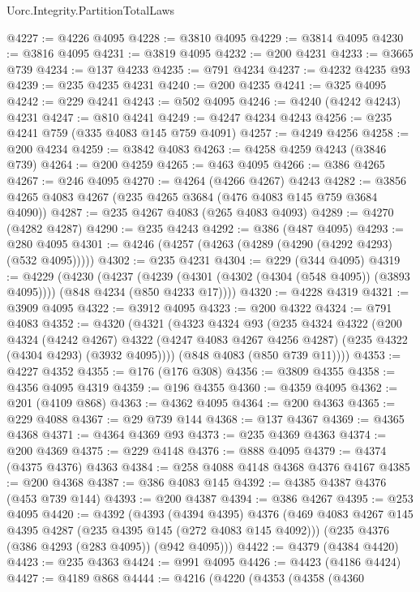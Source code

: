 \begin{lexlean}{Uorc.Integrity.PartitionTotalLaws}
\begin{coremodule}
@4227 := @4226 @4095
@4228 := @3810 @4095
@4229 := @3814 @4095
@4230 := @3816 @4095
@4231 := @3819 @4095
@4232 := @200 @4231
@4233 := @3665 @739
@4234 := @137 @4233
@4235 := @791 @4234
@4237 := @4232 @4235 @93
@4239 := @235 @4235 @4231
@4240 := @200 @4235
@4241 := @325 @4095
@4242 := @229 @4241
@4243 := @502 @4095
@4246 := @4240 (@4242 @4243) @4231
@4247 := @810 @4241
@4249 := @4247 @4234 @4243
@4256 := @235 @4241 @759 (@335 @4083 @145 @759 @4091)
@4257 := @4249 @4256
@4258 := @200 @4234
@4259 := @3842 @4083
@4263 := @4258 @4259 @4243 (@3846 @739)
@4264 := @200 @4259
@4265 := @463 @4095
@4266 := @386 @4265
@4267 := @246 @4095
@4270 := @4264 (@4266 @4267) @4243
@4282 := @3856 @4265 @4083 @4267 (@235 @4265 @3684 (@476 @4083 @145 @759 @3684 @4090))
@4287 := @235 @4267 @4083 (@265 @4083 @4093)
@4289 := @4270 (@4282 @4287)
@4290 := @235 @4243
@4292 := @386 (@487 @4095)
@4293 := @280 @4095
@4301 := @4246 (@4257 (@4263 (@4289 (@4290 (@4292 @4293) (@532 @4095)))))
@4302 := @235 @4231
@4304 := @229 (@344 @4095)
@4319 := @4229
    (@4230
      (@4237
        (@4239 (@4301 (@4302 (@4304 (@548 @4095)) (@3893 @4095))))
        (@848 @4234 (@850 @4233 @17))))
@4320 := @4228 @4319
@4321 := @3909 @4095
@4322 := @3912 @4095
@4323 := @200 @4322
@4324 := @791 @4083
@4352 := @4320
    (@4321
      (@4323
        @4324
        @93
        (@235
          @4324
          @4322
          (@200
            @4324
            (@4242 @4267)
            @4322
            (@4247 @4083 @4267 @4256 @4287)
            (@235 @4322 (@4304 @4293) (@3932 @4095))))
        (@848 @4083 (@850 @739 @11))))
@4353 := @4227 @4352
@4355 := @176 (@176 @308)
@4356 := @3809 @4355
@4358 := @4356 @4095 @4319
@4359 := @196 @4355
@4360 := @4359 @4095
@4362 := @201 (@4109 @868)
@4363 := @4362 @4095
@4364 := @200 @4363
@4365 := @229 @4088
@4367 := @29 @739 @144
@4368 := @137 @4367
@4369 := @4365 @4368
@4371 := @4364 @4369 @93
@4373 := @235 @4369 @4363
@4374 := @200 @4369
@4375 := @229 @4148
@4376 := @888 @4095
@4379 := @4374 (@4375 @4376) @4363
@4384 := @258 @4088 @4148 @4368 @4376 @4167
@4385 := @200 @4368
@4387 := @386 @4083 @145
@4392 := @4385 @4387 @4376 (@453 @739 @144)
@4393 := @200 @4387
@4394 := @386 @4267
@4395 := @253 @4095
@4420 := @4392
    (@4393
      (@4394 @4395)
      @4376
      (@469 @4083 @4267 @145 @4395 @4287 (@235 @4395 @145 (@272 @4083 @145 @4092)))
      (@235 @4376 (@386 @4293 (@283 @4095)) (@942 @4095)))
@4422 := @4379 (@4384 @4420)
@4423 := @235 @4363
@4424 := @991 @4095
@4426 := @4423 (@4186 @4424)
@4427 := @4189 @868
@4444 := @4216
    (@4220
      (@4353
        (@4358
          (@4360

\end{coremodule}
\end{lexlean}
